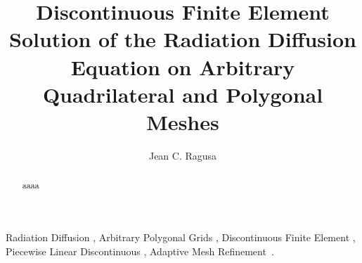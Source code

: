 \documentclass[preprint,10pt]{elsarticle}
\begin{document}
 

\begin{frontmatter}



\title{Discontinuous Finite Element Solution of the Radiation Diffusion Equation on Arbitrary Quadrilateral and Polygonal Meshes}


\author{Jean C. Ragusa}

\begin{abstract}

aaaa

\end{abstract}

\begin{keyword}
  Radiation Diffusion \sep
	Arbitrary Polygonal Grids \sep
  Discontinuous Finite Element \sep
  Piecewise Linear Discontinuous \sep
  Adaptive Mesh Refinement\, .
\end{keyword}

\end{frontmatter}

\end{document}
